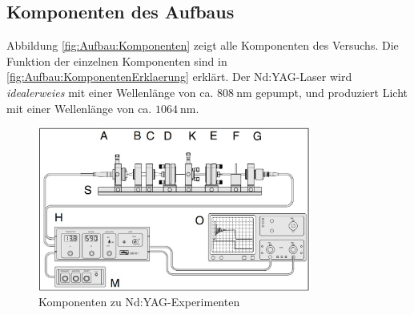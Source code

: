 \documentclass[../main.tex]{subfiles}
\begin{document}
    \subsection{Komponenten des Aufbaus}\label{sec:Aufbau:Komponenten}
        Abbildung \ref{fig:Aufbau:Komponenten} zeigt alle Komponenten des Versuchs. Die Funktion der einzelnen Komponenten sind in \ref{fig:Aufbau:KomponentenErklaerung} erklärt. Der Nd:YAG-Laser wird \textit{idealerweies} mit einer Wellenlänge von ca. $\SI{808}{\nano\metre}$ gepumpt, und produziert Licht mit einer Wellenlänge von ca. $\SI{1064}{\nano\metre}$.
        \begin{figure}[H]
            \centering
            \includegraphics[width=0.8\textwidth]{Bilddateien/Versuchsaufbau/Komponenten.jpg}
            \caption{Komponenten zu Nd:YAG-Experimenten \cite[p.25]{doc:experiment08}}
            \label{fig:Aubau:Komponenten}
        \end{figure}
\end{document}

